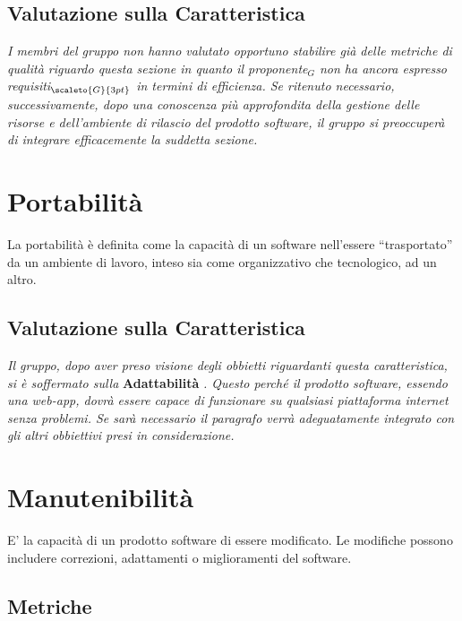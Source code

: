 \subsection{Valutazione sulla Caratteristica} \label{QualitàDelProdottoEfficienzaValutazioneSullaCaratteristica}
\textit{I membri del gruppo non hanno valutato opportuno stabilire già delle metriche di qualità riguardo questa sezione in quanto il proponente$_G$ non ha ancora espresso requisiti$_{\scaleto{G}{3pt}}$ in termini di efficienza. Se ritenuto necessario, successivamente, dopo una conoscenza più approfondita della gestione delle risorse e dell’ambiente di rilascio del prodotto software, il gruppo si preoccuperà di integrare efficacemente la suddetta sezione.}

\section{Portabilità} \label{QualitàDelProdottoPortabilità}
La portabilità è definita come la capacità di un software nell’essere “trasportato” da un ambiente di lavoro, inteso sia come organizzativo che tecnologico,  ad un altro.

\subsection{Valutazione sulla Caratteristica} \label{QualitàDelProdottoPortabilitàValutazioneSullaCaratteristica}
\textit{Il gruppo, dopo aver preso visione degli obbietti riguardanti questa caratteristica, si è soffermato sulla }\textbf{Adattabilità} \textit{.
Questo perché il prodotto software, essendo una web-app, dovrà essere capace di funzionare su qualsiasi piattaforma internet senza problemi.
Se sarà necessario il paragrafo verrà adeguatamente integrato con gli altri obbiettivi presi in considerazione.}

\section{Manutenibilità} \label{QualitàDelProdottoManutenibilità}
E' la capacità di un prodotto software di essere modificato. Le modifiche possono includere correzioni, adattamenti o miglioramenti del software.
\subsection{Metriche}  \label{QualitàDelProdottoManutenibilitàMetriche}
